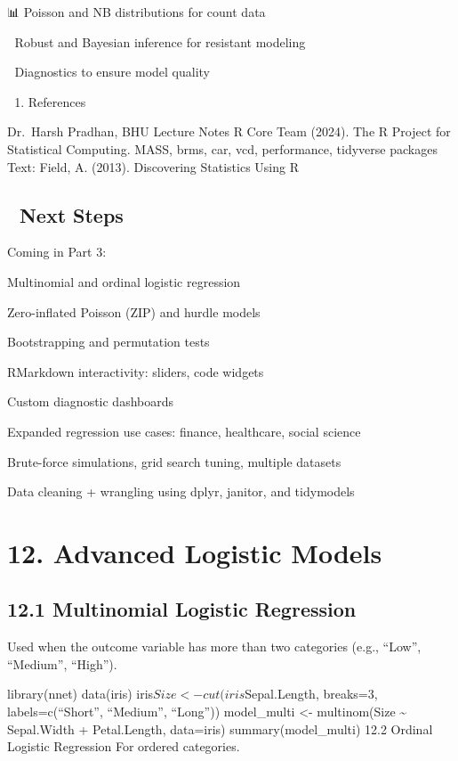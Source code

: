 \documentclass[
  letterpaper,
  DIV=11,
  numbers=noendperiod]{scrreprt}
\providecommand{\tightlist}{%
  \setlength{\itemsep}{0pt}\setlength{\parskip}{0pt}}
\begin{document}
📊 Poisson and NB distributions for count data

🧠 Robust and Bayesian inference for resistant modeling

🧪 Diagnostics to ensure model quality

\begin{enumerate}
\def\labelenumi{\arabic{enumi}.}
\setcounter{enumi}{10}
\tightlist
\item
  References
\end{enumerate}

Dr.~Harsh Pradhan, BHU Lecture Notes R Core Team (2024). The R Project
for Statistical Computing. MASS, brms, car, vcd, performance, tidyverse
packages Text: Field, A. (2013). Discovering Statistics Using R

\subsection{🚀 Next Steps}\label{next-steps}

Coming in Part 3:

Multinomial and ordinal logistic regression

Zero-inflated Poisson (ZIP) and hurdle models

Bootstrapping and permutation tests

RMarkdown interactivity: sliders, code widgets

Custom diagnostic dashboards

Expanded regression use cases: finance, healthcare, social science

Brute-force simulations, grid search tuning, multiple datasets

Data cleaning + wrangling using dplyr, janitor, and tidymodels

\section{12. Advanced Logistic Models}\label{advanced-logistic-models}

\subsection{12.1 Multinomial Logistic
Regression}\label{multinomial-logistic-regression}

Used when the outcome variable has more than two categories (e.g.,
``Low'', ``Medium'', ``High'').

library(nnet) data(iris) iris\(Size <- cut(iris\)Sepal.Length, breaks=3,
labels=c(``Short'', ``Medium'', ``Long'')) model\_multi \textless-
multinom(Size \textasciitilde{} Sepal.Width + Petal.Length, data=iris)
summary(model\_multi) 12.2 Ordinal Logistic Regression For ordered
categories.
\end{document}
